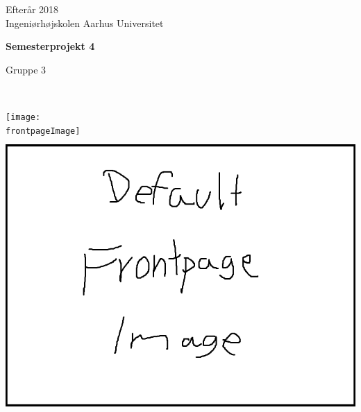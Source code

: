 \begin{center}
	{\fontsize{12pt}{0}\selectfont
		Efterår 2018\\
	}
		\vspace{5pt}
	{\fontsize{12pt}{0}\selectfont
		Ingeniørhøjskolen Aarhus Universitet\\
	}

	\vspace{25pt}
	
	{\fontsize{42pt}{0}\selectfont
		\textbf{Semesterprojekt 4\\}
	}
	\vspace{5pt}
	
	{\fontsize{28pt}{0}\selectfont
		Gruppe 3\\
	}
	\vspace{25pt}
	

	{\fontsize{28pt}{0}\selectfont
        \textbf{\thetitle\\}
	}
	\vspace{20pt}

	\ifdefined\frontpageImage
		\texttt{[image: \\frontpageImage]}
	\else
		\includegraphics[width=\linewidth,height=300pt,keepaspectratio]{defaultfrontpageimage.png}
	\fi
	\vspace*{\fill}


\end{center}
